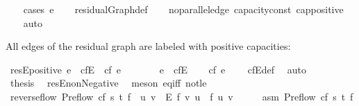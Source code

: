 \begin{isabellebody}
%
\isadelimproof
\ \ %
\endisadelimproof
%
\isatagproof
{}\isamarkupfalse%
\ {\isacharparenleft}cases\ e{\isacharparenright}\isanewline
\ \ \isamarkupfalse%
\ residualGraph{\isacharunderscore}def\isanewline
\ \ \isamarkupfalse%
\ no{\isacharunderscore}parallel{\isacharunderscore}edge\ capacity{\isacharunderscore}const\ cap{\isacharunderscore}positive\isanewline
\ \ \isamarkupfalse%
\ auto%
\endisatagproof
{\isafoldproof}%
%
\isadelimproof
%
\endisadelimproof
%
\begin{isamarkuptext}%
All edges of the residual graph are labeled with positive capacities:%
\end{isamarkuptext}\isamarkuptrue%
\isamarkupfalse%
\ resE{\isacharunderscore}positive{\isacharcolon}\ {\isachardoublequoteopen}e\ {\isasymin}\ cf{\isachardot}E\ {\isasymLongrightarrow}\ cf\ e\ {\isachargreater}\ {}{\isachardoublequoteclose}\isanewline
%
\isadelimproof
%
\endisadelimproof
%
\isatagproof
{}\isamarkupfalse%
\ {\isacharminus}\isanewline
\ \ \isamarkupfalse%
\ {\isachardoublequoteopen}e\ {\isasymin}\ cf{\isachardot}E{\isachardoublequoteclose}\isanewline
\ \ \isamarkupfalse%
\ {\isachardoublequoteopen}cf\ e\ {\isasymnoteq}\ {}{\isachardoublequoteclose}\ \isamarkupfalse%
\ cf{\isachardot}E{\isacharunderscore}def\ \isamarkupfalse%
\ auto\isanewline
\ \ \isamarkupfalse%
\ {\isacharquery}thesis\ \isamarkupfalse%
\ resE{\isacharunderscore}nonNegative\ \isamarkupfalse%
\ {\isacharparenleft}meson\ eq{\isacharunderscore}iff\ not{\isacharunderscore}le{\isacharparenright}\isanewline
{}\isamarkupfalse%
%
\endisatagproof
{\isafoldproof}%
%
\isadelimproof
\ \isanewline
%
\endisadelimproof
\ \ \ \ \ \ \isanewline
\ \ \isanewline
{}\isamarkupfalse%
\ reverse{\isacharunderscore}flow{\isacharcolon}\ {\isachardoublequoteopen}Preflow\ cf\ s\ t\ f{\isacharprime}\ {\isasymLongrightarrow}\ {\isasymforall}{\isacharparenleft}u{\isacharcomma}\ v{\isacharparenright}\ {\isasymin}\ E{\isachardot}\ f{\isacharprime}\ {\isacharparenleft}v{\isacharcomma}\ u{\isacharparenright}\ {\isasymle}\ f\ {\isacharparenleft}u{\isacharcomma}\ v{\isacharparenright}{\isachardoublequoteclose}\isanewline
%
\isadelimproof
%
\endisadelimproof
%
\isatagproof
{}\isamarkupfalse%
\ {\isacharminus}\isanewline
\ \ \isamarkupfalse%
\ asm{\isacharcolon}\ {\isachardoublequoteopen}Preflow\ cf\ s\ t\ f{\isacharprime}{\isachardoublequoteclose}\isanewline

\end{isabellebody}
